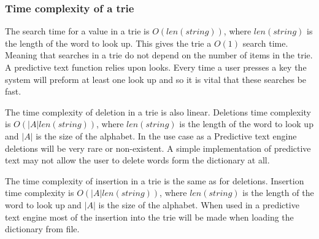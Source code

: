 \documentclass[10pt]{article} %
\begin{document}
			\subsubsection{Time complexity of a trie}
				The search time for a value in a trie is \begin{math}O(len(string))\end{math}, where \begin{math}len(string)\end{math} is the length of the word to look up\cite{book:ADS:complexity}. This gives the trie a \begin{math} O(1) \end{math} search time. Meaning that searches in a trie do not depend on the number of items in the trie. A predictive text function relies upon looks. Every time a user presses a key the system will preform at least one look up and so it is vital that these searches be fast. 
				
				The time complexity of deletion in a trie is also linear. Deletions time complexity is 
				\begin{math}O(\vert A \vert len(string))\end{math}, where \begin{math}len(string)\end{math} is the length of the word to look up and \begin{math}\vert A \vert \end{math} is the size of the alphabet\cite{book:ADS:complexity}.
				In the use case as a Predictive text engine deletions will be very rare or non-existent.
				A simple implementation of predictive text may not allow the user to delete words form the dictionary at all. 
				
				The time complexity of insertion in a trie is the same as for deletions. Insertion time complexity is \begin{math}O(\vert A \vert len(string))\end{math}, where \begin{math}len(string)\end{math} is the length of the word to look up and \begin{math}\vert A \vert \end{math} is the size of the alphabet\cite{book:ADS:complexity}.
				When used in a predictive text engine most of the insertion into the trie will be made when loading the dictionary from file. 
				
\end{document}
